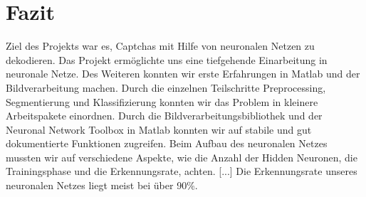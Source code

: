 \section{Fazit}
Ziel des Projekts war es, Captchas mit Hilfe von neuronalen Netzen zu dekodieren. Das Projekt ermöglichte uns eine tiefgehende Einarbeitung in neuronale Netze. Des Weiteren konnten wir erste Erfahrungen in Matlab und der Bildverarbeitung machen. Durch die einzelnen Teilschritte Preprocessing, Segmentierung und Klassifizierung konnten wir das Problem in kleinere Arbeitspakete einordnen. Durch die Bildverarbeitungsbibliothek und der Neuronal Network Toolbox in Matlab konnten wir auf stabile und gut dokumentierte Funktionen zugreifen. Beim Aufbau des neuronalen Netzes mussten wir auf verschiedene Aspekte, wie die Anzahl der Hidden Neuronen, die Trainingsphase und die Erkennungsrate, achten. [...] Die Erkennungsrate unseres neuronalen Netzes liegt meist bei über 90\%.